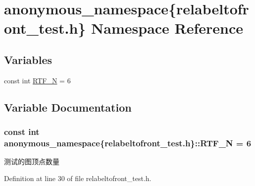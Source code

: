 \hypertarget{namespaceanonymous__namespace_02relabeltofront__test_8h_03}{}\section{anonymous\+\_\+namespace\{relabeltofront\+\_\+test.\+h\} Namespace Reference}
\label{namespaceanonymous__namespace_02relabeltofront__test_8h_03}
\subsection*{Variables}
\begin{DoxyCompactItemize}
\item 
const int \hyperlink{namespaceanonymous__namespace_02relabeltofront__test_8h_03_a05b071cdd5828fa4549bc99ce04c68c4}{R\+T\+F\+\_\+\+N} = 6
\end{DoxyCompactItemize}


\subsection{Variable Documentation}
\hypertarget{namespaceanonymous__namespace_02relabeltofront__test_8h_03_a05b071cdd5828fa4549bc99ce04c68c4}{}
\subsubsection[{R\+T\+F\+\_\+\+N}]{\setlength{\rightskip}{0pt plus 5cm}const int anonymous\+\_\+namespace\{relabeltofront\+\_\+test.\+h\}\+::R\+T\+F\+\_\+\+N = 6}\label{namespaceanonymous__namespace_02relabeltofront__test_8h_03_a05b071cdd5828fa4549bc99ce04c68c4}
测试的图顶点数量 

Definition at line 30 of file relabeltofront\+\_\+test.\+h.

